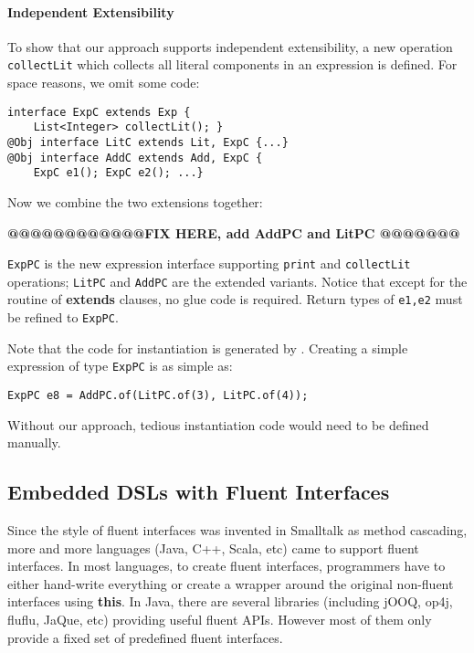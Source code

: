 \paragraph{Independent Extensibility}
To show that our approach supports independent extensibility, a
new operation \texttt{collectLit} which collects all
literal components in an expression is defined. For space reasons,
we omit some code:

\begin{lstlisting}[]
interface ExpC extends Exp {
    List<Integer> collectLit(); }
@Obj interface LitC extends Lit, ExpC {...}
@Obj interface AddC extends Add, ExpC {
    ExpC e1(); ExpC e2(); ...}
\end{lstlisting}

\noindent Now we combine the two extensions together:


{\bf @@@@@@@@@@@@FIX HERE, add AddPC and LitPC @@@@@@@}

\noindent \texttt{ExpPC} is the new expression interface supporting
\texttt{print} and \texttt{collectLit} operations; \texttt{LitPC} and
\texttt{AddPC} are the extended variants. Notice that except for the routine of
\textbf{extends} clauses, no glue code is required. Return types of
\texttt{e1,e2} must be refined to \texttt{ExpPC}.

Note that the code for instantiation is generated by \mixin.
Creating a simple expression of type \texttt{ExpPC} is
as simple as:
\begin{lstlisting}
ExpPC e8 = AddPC.of(LitPC.of(3), LitPC.of(4));
\end{lstlisting}
\noindent Without our approach, tedious instantiation code would need
to be defined manually.

\subsection{Embedded DSLs with Fluent Interfaces}\label{sec:dsls}
Since the style of fluent interfaces was invented in Smalltalk as method
cascading, more and more languages (Java, C++, Scala, etc) came to support fluent interfaces. In most languages, to create fluent
interfaces, programmers have to either hand-write everything or create a wrapper
around the original non-fluent interfaces using \textbf{this}. In Java, there
are several libraries (including jOOQ, op4j, fluflu, JaQue, etc) providing useful
fluent APIs. However most of them only provide a fixed set of predefined fluent
interfaces. %

